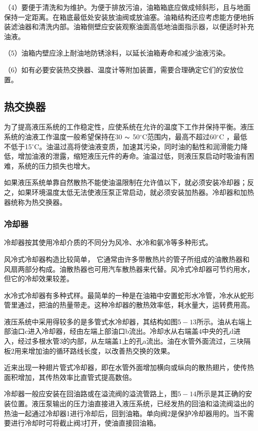 （4）要便于清洗和为维护。为便于排放污油，油箱箱底应做成倾斜形，且与地面保持一定距离。在箱底最低处安装放油阀或放油塞。油箱结构还应考虑能方便地拆装滤油器和清洗内部。油箱侧壁应安装观察油面高低地油面指示器，以便适时补充油液。

（5）油箱内壁应涂上耐油地防锈涂料，以延长油箱寿命和减少油液污染。

（6）如有必要安装热交换器、温度计等附加装置，需要合理确定它们的安放位置。

\subsection{热交换器}

为了提高液压系统的工作稳定性，应使系统在允许的温度下工作并保持平衡。液压系统的油液工作温度一般希望保持在30 $ \thicksim$ 50$^\circ$C范围内，最高不超过60$^\circ$C ，最低不低于15$^\circ$C。油温过高将使油液变质，加速其污染，同时油的黏性和润滑能力降低，增加油液的泄露，缩短液压元件的寿命。油温过低，则液压泵启动时吸油有困难，系统的压力损失也增大。

如果液压系统单靠自然散热不能使油温限制在允许值以下，就必须安装冷却器；反之，如果环境温度太低无法使液压泵正常启动，就必须安装加热器。冷却器和加热器统称为热交换器。
\subsubsection{冷却器}
冷却器按其使用冷却介质的不同分为风冷、水冷和氨冷等多种形式。

风冷式冷却器构造比较简单， 它通常由许多带散热片的管子所组成的油散热器和风扇两部分构成。油散热器也可用汽车散热器来代替。风冷式冷却器可节约用水，但它的冷却效果较差。

水冷式冷却器有多种式样。最简单的一种是在油箱中安置蛇形水冷管，冷水从蛇形管里通过，把油的热量带走。这种冷却器的散热效率低，耗水量大，运转费用高。

液压系统中采用得较多的是多管式水冷却器，其结构如图$5-13$所示。油从右端上部油口c进入冷却器，经由左端上部油口b流出。冷却水从右端盖$4$中央的孔d进入，经过多根水管$3$的内部，从左端盖$1$上的孔a流出。油在水管外面流过，三块隔板$2$用来增加油的循环路线长度，以改善热交换的效果。


近来出现一种翅片管式冷却器，即在水管外面增加横向或纵向的散热翅片，使传热面积增加，其传热效率比直管式提高数倍。

冷却器一般应安装在回油路或在溢流阀的溢流管路上，图$5-14$所示是其正确的安装位置。液压泵输出的压力油直接进入液压系统，已经发热的回油和溢流阀溢出的热油一起通过冷却器1进行冷却后，回到油箱。单向阀$2$是保护冷却器用的。当不需要进行冷却时可将截止阀$3$打开，使油直接回油箱。


